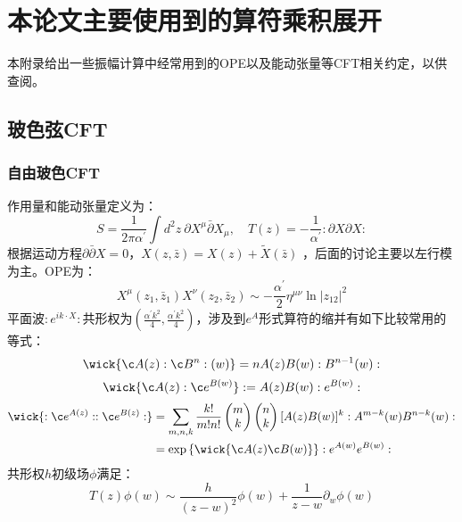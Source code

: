 
\chapter{本论文主要使用到的算符乘积展开}
\label{appendix:A}
本附录给出一些振幅计算中经常用到的OPE以及能动张量等CFT相关约定，以供查阅。
\section{玻色弦CFT}
\subsection{自由玻色CFT}
作用量和能动张量定义为：
\begin{equation}
	\label{eq:A1}
	S=\frac{1}{2\pi\alpha^{\prime}}\int d^2z\mathrm{~}\partial X^\mu\bar{\partial}X_\mu,\quad
	T(z)=-\frac{1}{\alpha^{\prime}}:\partial X\partial X:
\end{equation}
根据运动方程$\partial\bar\partial X = 0$，$X(z,\bar z) = X(z) + \tilde X(\bar z)$ ，后面的讨论主要以左行模为主。OPE为：
\begin{equation}
	\label{eq:A2}
	X^\mu(z_1,\bar{z}_1)X^\nu(z_2,\bar{z}_2)\sim-\frac{\alpha^\prime}{2}\eta^{\mu\nu}\ln|z_{12}|^2
\end{equation}
平面波$:e^{ik\cdot X}:$共形权为$\left(\frac{\alpha^{\prime}k^2}{4},\frac{\alpha^{\prime}k^2}{4}\right)$，涉及到$e^A$形式算符的缩并有如下比较常用的等式：
\begin{equation}
\wick{\c A(z): \c B^n:(w)}=nA(z)B(w):B^{n-1}(w):
\end{equation}
\begin{equation}
	\wick{\c A(z):\c e^{B(w)}}:=A(z)B(w):e^{B(w)}:
\end{equation}
\begin{equation}
	\begin{aligned}
		\wick{:\c e^{A(z)}::\c e^{B(z)}:}&=\sum_{m,n,k}\frac{k!}{m!n!}\begin{pmatrix}m\\k\end{pmatrix}\begin{pmatrix}n\\k\end{pmatrix}[{A(z)}B(w)]^k:A^{m-k}(w)B^{n-k}(w):\\&=\exp\left\{\wick{\c A(z)\c B(w)}\right\}:e^{A(w)}e^{B(w)}:
	\end{aligned}
\end{equation}
共形权$h$初级场$\phi$满足：
\begin{equation}
	T(z)\phi(w)\sim\frac{h}{(z-w)^{2}}\phi(w)+\frac{1}{z-w}\partial_{w}\phi(w)
\end{equation}
